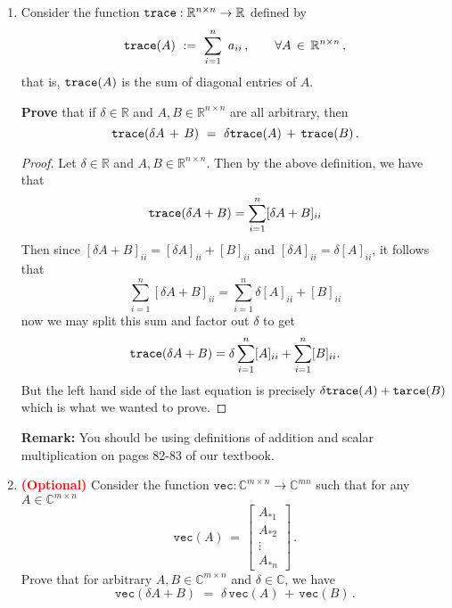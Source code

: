 \documentclass[11pt,table]{article}
\newcommand{\<}				{\langle}
\renewcommand{\>}      		{\rangle}
\newcommand{\bC}{\mathbb{C}}
\newcommand{\bR}{\mathbb{R}}
\def\Rnn{\mathbb{R}^{n\times n}}
\def\Cmn{\mathbb{C}^{m\times n}}
\begin{document}
\begin{enumerate}

\item 
Consider the function ${\tt trace}: \Rnn \rightarrow \bR$ 
defined by 
\begin{equation} \label{eq:trace-def} 
	{\tt trace}(A) 
	\,\, := \,\, 
	\sum_{i=1}^n \, \, a_{ii} \, , \qquad \forall  A \, \in \,  \Rnn \, ,
\end{equation} 
that is, ${\tt trace}(A)$ is the sum of diagonal entries of $A$. 

\medskip

{\bf Prove} that if  $\delta \in \bR$ and $A, B \in \Rnn$ 
are all arbitrary, then 
\begin{equation} \label{eq:trace-property}
	{\tt trace}(\delta A \, + \, B) \,\,  = \,\, \delta {\tt trace}(A) \, + \, {\tt trace}(B)\, .
\end{equation} 


\begin{proof}
	Let $\delta \in \bR$ and $A, B \in \Rnn$. Then by the above definition, we have 
	that 
	\[{\tt trace}(\delta A + B) = \sum_{i = 1}^n [\delta A + B]_{ii}\]
	Then since $[\delta A + B]_{ii} = [\delta A]_{ii} + [B]_{ii}$ and $[\delta A]_{ii} = \delta [A]_{ii}$, it follows that 
	\[\sum_{i = 1}^n [\delta A + B]_{ii} = \sum_{i = 1}^n \delta [A]_{ii} + [B]_{ii} \]
	now we may split this sum and factor out $\delta$ to get 
	\[{\tt trace}(\delta A + B) = \delta \sum_{i = 1}^n [A]_{ii} + \sum_{i = 1}^n [B]_{ii}.\]
	But the left hand side of the last equation is precisely $\delta {\tt trace}(A) + {\tt tarce}(B)$ which is what we wanted to prove. 
\end{proof}
\medskip

{\bf Remark:} You should be using definitions of addition 
and scalar multiplication on pages 82-83 of our textbook. 



\item 
\textcolor{red}{\bf (Optional)} Consider the function $
		\texttt{vec} : 
		\Cmn \rightarrow \bC^{mn} 		
	$
	such that for any $A \in \Cmn$ 
	\begin{equation} \label{prob1-eqn-vec-definition}
		\texttt{vec}(A) \, = \, 
		\left[ 
			\begin{array}{c}
				A_{*1} \\ 
				A_{*2} \\
				\vdots \\
				A_{*n}
			\end{array}
		\right] 
		\, .
	\end{equation} 
	Prove that for arbitrary $A, B \in  \Cmn$ and $\delta \in \bC$, we have 
	\begin{equation} \label{prob1-eqn2}
		\texttt{vec}(\delta A + B) 
		\,\, = \,\, 
		\delta \, \texttt{vec}(A) 
		\, + \, 
		\texttt{vec}(B) \, .
	\end{equation} 


\end{enumerate}
\end{document}
